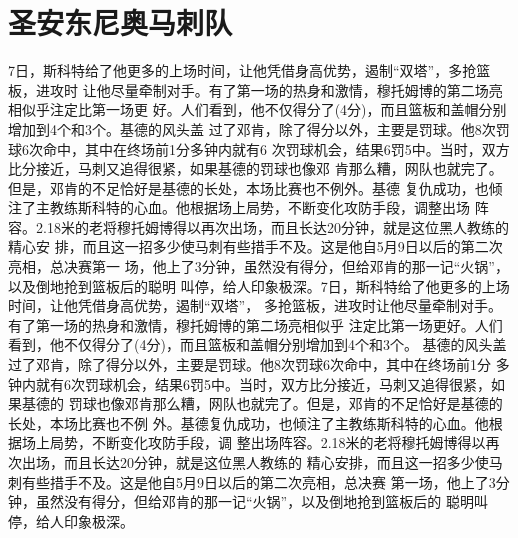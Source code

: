 \documentclass[openany]{book}
\begin{document}
\section{圣安东尼奥马刺队}
7日，斯科特给了他更多的上场时间，让他凭借身高优势，遏制“双塔”，多抢篮板，进攻时
让他尽量牵制对手。有了第一场的热身和激情，穆托姆博的第二场亮相似乎注定比第一场更
好。人们看到，他不仅得分了(4分)，而且篮板和盖帽分别增加到4个和3个。基德的风头盖
过了邓肯，除了得分以外，主要是罚球。他8次罚球6次命中，其中在终场前1分多钟内就有6
次罚球机会，结果6罚5中。当时，双方比分接近，马刺又追得很紧，如果基德的罚球也像邓
肯那么糟，网队也就完了。但是，邓肯的不足恰好是基德的长处，本场比赛也不例外。基德
复仇成功，也倾注了主教练斯科特的心血。他根据场上局势，不断变化攻防手段，调整出场
阵容。2.18米的老将穆托姆博得以再次出场，而且长达20分钟，就是这位黑人教练的精心安
排，而且这一招多少使马刺有些措手不及。这是他自5月9日以后的第二次亮相，总决赛第一
场，他上了3分钟，虽然没有得分，但给邓肯的那一记“火锅”，以及倒地抢到篮板后的聪明
叫停，给人印象极深。7日，斯科特给了他更多的上场时间，让他凭借身高优势，遏制“双塔”，
多抢篮板，进攻时让他尽量牵制对手。有了第一场的热身和激情，穆托姆博的第二场亮相似乎
注定比第一场更好。人们看到，他不仅得分了(4分)，而且篮板和盖帽分别增加到4个和3个。
基德的风头盖过了邓肯，除了得分以外，主要是罚球。他8次罚球6次命中，其中在终场前1分
多钟内就有6次罚球机会，结果6罚5中。当时，双方比分接近，马刺又追得很紧，如果基德的
罚球也像邓肯那么糟，网队也就完了。但是，邓肯的不足恰好是基德的长处，本场比赛也不例
外。基德复仇成功，也倾注了主教练斯科特的心血。他根据场上局势，不断变化攻防手段，调
整出场阵容。2.18米的老将穆托姆博得以再次出场，而且长达20分钟，就是这位黑人教练的
精心安排，而且这一招多少使马刺有些措手不及。这是他自5月9日以后的第二次亮相，总决赛
第一场，他上了3分钟，虽然没有得分，但给邓肯的那一记“火锅”，以及倒地抢到篮板后的
聪明叫停，给人印象极深。
\end{document}
